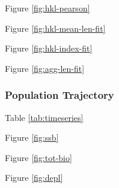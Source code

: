 \documentclass[11pt,
  english,
  a4paper,
]{article}
\begin{document}
Figure \ref{fig:hkl-pearson}

\leavevmode\tagmcend\tagstructend\par


Figure \ref{fig:hkl-mean-len-fit}

\leavevmode\tagmcend\tagstructend\par


Figure \ref{fig:hkl-index-fit}

\leavevmode\tagmcend\tagstructend\par


Figure \ref{fig:agg-len-fit}

\leavevmode\tagmcend\tagstructend\par


\hypertarget{population-trajectory}{%
\subsubsection{Population Trajectory}\label{population-trajectory}}

\leavevmode\tagmcend\tagstructend


Table \ref{tab:timeseries}

\leavevmode\tagmcend\tagstructend\par


Figure \ref{fig:ssb}

\leavevmode\tagmcend\tagstructend\par


Figure \ref{fig:tot-bio}

\leavevmode\tagmcend\tagstructend\par


Figure \ref{fig:depl}

\leavevmode\tagmcend\tagstructend\par

\end{document}
